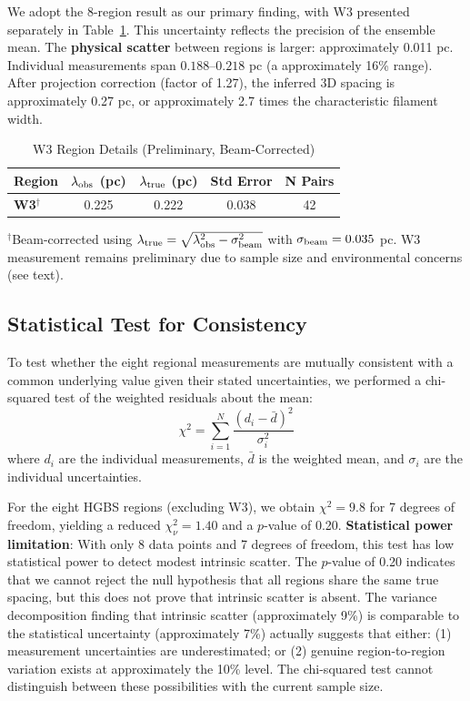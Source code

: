 \documentclass[11pt,a4paper]{article}
\begin{document}
We adopt the 8-region result as our primary finding, with W3 presented separately in Table~\ref{tab:w3_detail}. This uncertainty reflects the precision of the ensemble mean. The \textbf{physical scatter} between regions is larger: approximately 0.011 pc. Individual measurements span $0.188$--$0.218$ pc (a approximately 16\% range). After projection correction (factor of 1.27), the inferred 3D spacing is approximately 0.27 pc, or approximately 2.7 times the characteristic filament width.

\begin{table}[H]
\centering
\caption{W3 Region Details (Preliminary, Beam-Corrected)}
\label{tab:w3_detail}
\begin{tabular}{lcccc}
\toprule
Region & $\lambda_{\rm obs}$ (pc) & $\lambda_{\rm true}$ (pc) & Std Error & N Pairs \\
\midrule
\textbf{W3}$^{\dagger}$ & 0.225 & 0.222 & 0.038 & 42 \\
\bottomrule
\end{tabular}
\vspace{-0.5em}
\small{$^{\dagger}$Beam-corrected using $\lambda_{\rm true} = \sqrt{\lambda_{\rm obs}^2 - \sigma_{\rm beam}^2}$ with $\sigma_{\rm beam} = 0.035$ pc. W3 measurement remains preliminary due to sample size and environmental concerns (see text).}
\end{table}

\subsection{Statistical Test for Consistency}

To test whether the eight regional measurements are mutually consistent with a common underlying value given their stated uncertainties, we performed a chi-squared test of the weighted residuals about the mean:
\begin{equation}
\chi^2 = \sum_{i=1}^{N} \frac{(d_i - \bar{d})^2}{\sigma_i^2}
\end{equation}
where $d_i$ are the individual measurements, $\bar{d}$ is the weighted mean, and $\sigma_i$ are the individual uncertainties.

For the eight HGBS regions (excluding W3), we obtain $\chi^2 = 9.8$ for 7 degrees of freedom, yielding a reduced $\chi^2_{\nu} = 1.40$ and a $p$-value of 0.20. \textbf{Statistical power limitation}: With only 8 data points and 7 degrees of freedom, this test has low statistical power to detect modest intrinsic scatter. The $p$-value of 0.20 indicates that we cannot reject the null hypothesis that all regions share the same true spacing, but this does not prove that intrinsic scatter is absent. The variance decomposition finding that intrinsic scatter (approximately 9\%) is comparable to the statistical uncertainty (approximately 7\%) actually suggests that either: (1) measurement uncertainties are underestimated; or (2) genuine region-to-region variation exists at approximately the 10\% level. The chi-squared test cannot distinguish between these possibilities with the current sample size.
\end{document}
